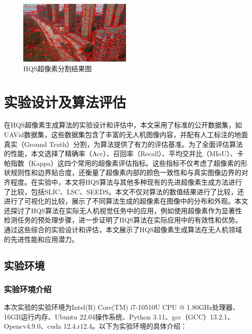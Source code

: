 \begin{figure}[htbp]
	\centering
    \includegraphics[width=0.5\textwidth]{pic/hqs/500/2.png}
	\caption{HQS超像素分割结果图}
      \label{fig:hqs}
\end{figure}

\newpage

\section{实验设计及算法评估}
在HQS超像素生成算法的实验设计和评估中，本文采用了标准的公开数据集，如UAVid数据集，这些数据集包含了丰富的无人机图像内容，并配有人工标注的地面真实（Ground Truth）分割，为算法提供了有力的评估基准。为了全面评估算法的性能，本文选择了精确率（Acc）、召回率（Recall）、平均交并比（MIoU）、卡帕指数（Kappa）这四个常用的超像素评估指标。这些指标不仅考虑了超像素的形状规则性和边界贴合度，还衡量了超像素内部的颜色一致性和与真实图像边界的对齐程度。在实验中，本文将HQS算法与其他多种现有的先进超像素生成方法进行了比较，包括SLIC、LSC、SEEDS。本文不仅对算法的数值结果进行了比较，还进行了可视化的比较，展示了不同算法生成的超像素在图像中的分布和外观。本文还探讨了HQS算法在实际无人机视觉任务中的应用，例如使用超像素作为显著性检测任务的预处理步骤，进一步证明了HQS算法在实际应用中的有效性和优势。通过这些综合的实验设计和评估，本文展示了HQS超像素生成算法在无人机领域的先进性能和应用潜力。

\subsection{实验环境}
\subsubsection{实验环境介绍}

本次实验的实验环境为Intel(R) Core(TM) i7-10510U CPU @ 1.80GHz处理器、16GB运行内存、Ubuntu 22.04操作系统、Python 3.11、gcc（GCC）13.2.1、Opencv4.9.0、cuda 12.4.r12.4。以下为实验环境的具体介绍：

